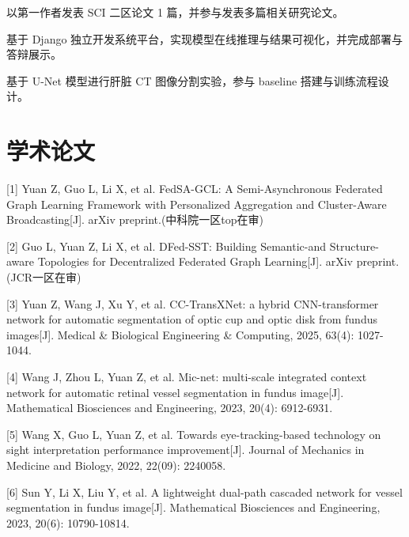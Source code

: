 \documentclass[]{deedy-resume-openfont}
\begin{document}
\begin{minipage}[t]{0.66\textwidth}
\vspace{\topsep} %
\begin{tightemize}
\item 以第一作者发表 SCI 二区论文 1 篇，并参与发表多篇相关研究论文。
\item 基于 Django 独立开发系统平台，实现模型在线推理与结果可视化，并完成部署与答辩展示。
\end{tightemize}
\sectionsep

\vspace{\topsep} %
\begin{tightemize}
\item 基于 U-Net 模型进行肝脏 CT 图像分割实验，参与 baseline 搭建与训练流程设计。
\end{tightemize}
\sectionsep

\sectionsep


\section{学术论文}
[1] Yuan Z, Guo L, Li X, et al. FedSA-GCL: A Semi-Asynchronous Federated Graph Learning Framework with Personalized Aggregation and Cluster-Aware Broadcasting[J]. arXiv preprint.(中科院一区top在审)

[2] Guo L, Yuan Z, Li X, et al. DFed-SST: Building Semantic-and Structure-aware Topologies for Decentralized Federated Graph Learning[J]. arXiv preprint.(JCR一区在审)

[3] Yuan Z, Wang J, Xu Y, et al. CC-TransXNet: a hybrid CNN-transformer network for automatic segmentation of optic cup and optic disk from fundus images[J]. Medical \& Biological Engineering \& Computing, 2025, 63(4): 1027-1044. 

[4] Wang J, Zhou L, Yuan Z, et al. Mic-net: multi-scale integrated context network for automatic retinal vessel segmentation in fundus image[J]. Mathematical Biosciences and Engineering, 2023, 20(4): 6912-6931.

[5] Wang X, Guo L, Yuan Z, et al. Towards eye-tracking-based technology on sight interpretation performance improvement[J]. Journal of Mechanics in Medicine and Biology, 2022, 22(09): 2240058.

[6] Sun Y, Li X, Liu Y, et al. A lightweight dual-path cascaded network for vessel segmentation in fundus image[J]. Mathematical Biosciences and Engineering, 2023, 20(6): 10790-10814.


\end{minipage} 
\end{document}
